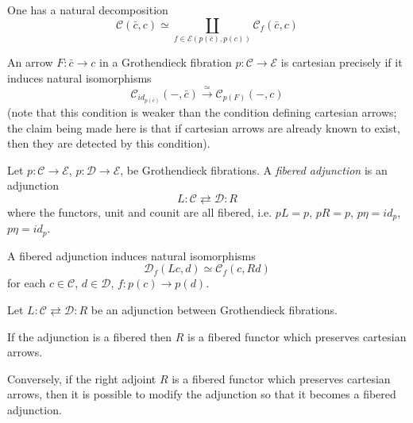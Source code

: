 \documentclass[a4paper,10pt
,draft
]{article}%
\renewcommand{\1}{\eta}%
\begin{document}
\begin{remark}
One has a natural decomposition
\begin{equation}
	\mathcal{C}(\bar{c},c) \simeq \coprod_{f \in \mathcal{E}(p(\bar{c}),p(c))} \mathcal{C}_f\left(\bar{c},c \right)
\end{equation}
\end{remark}


\begin{remark}\label{CARTCHAR REM}
An arrow $F\colon \bar{c} \to c$ in a Grothendieck fibration
$p \colon \mathcal{C} \to \mathcal{E}$ is cartesian
precisely if it induces natural isomorphisms
\[
\mathcal{C}_{id_{p(\bar{c})}}
\left(- ,\bar{c} \right)
\xrightarrow{\simeq}
\mathcal{C}_{p(F)}\left(- ,c \right)
\]
(note that this condition is weaker than the condition defining cartesian arrows; the claim being made here is that if cartesian arrows are already known to exist, then they are detected by this condition).
\end{remark}



\begin{definition}
Let 
$p\colon \mathcal{C} \to \mathcal{E}$,
$p\colon \mathcal{D} \to \mathcal{E}$,
be Grothendieck fibrations.
A \emph{fibered adjunction} is an adjunction
\[
L \colon \mathcal{C} \rightleftarrows \mathcal{D} \colon R
\]
where the functors, unit and counit are all fibered, i.e.
$pL=p$, $pR=p$, $p \eta = id_{p}$, $p\eta = id_p$.
\end{definition}


\begin{remark}
A fibered adjunction induces natural isomorphisms
\[
\mathcal{D}_f\left(Lc,d\right)
\simeq
\mathcal{C}_f\left(c,Rd\right)
\]
for each $c\in \mathcal{C}$, $d \in \mathcal{D}$, $f\colon p(c)\to p(d)$. 
\end{remark}



\begin{proposition}
Let $L \colon \mathcal{C} \rightleftarrows \mathcal{D} \colon R$
be an adjunction between Grothendieck fibrations.

If the adjunction is a fibered then 
$R$ is 
a fibered functor which preserves cartesian arrows.

Conversely, if the right adjoint $R$ is 
a fibered functor which preserves cartesian arrows, then it is possible to modify the adjunction so that it becomes a fibered adjunction.

\end{proposition}
\end{document}
